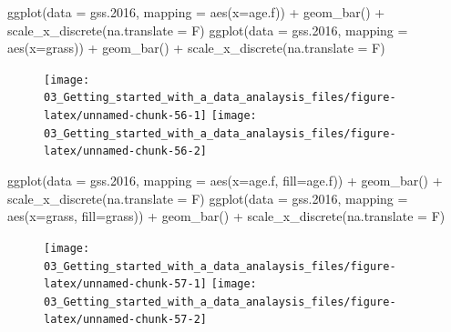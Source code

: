 \documentclass[
]{book}
\newenvironment{Shaded}{\begin{snugshade}}{\end{snugshade}}
\newcommand{\AttributeTok}[1]{\textcolor[rgb]{0.77,0.63,0.00}{#1}}
\newcommand{\FloatTok}[1]{\textcolor[rgb]{0.00,0.00,0.81}{#1}}
\newcommand{\FunctionTok}[1]{\textcolor[rgb]{0.00,0.00,0.00}{#1}}
\newcommand{\NormalTok}[1]{#1}
\newcommand{\SpecialCharTok}[1]{\textcolor[rgb]{0.00,0.00,0.00}{#1}}
\begin{document}
\begin{Shaded}
\begin{Highlighting}[]
\FunctionTok{ggplot}\NormalTok{(}\AttributeTok{data =}\NormalTok{ gss}\FloatTok{.2016}\NormalTok{, }\AttributeTok{mapping =} \FunctionTok{aes}\NormalTok{(}\AttributeTok{x=}\NormalTok{age.f)) }\SpecialCharTok{+} \FunctionTok{geom\_bar}\NormalTok{() }\SpecialCharTok{+} 
  \FunctionTok{scale\_x\_discrete}\NormalTok{(}\AttributeTok{na.translate =}\NormalTok{ F)}
\FunctionTok{ggplot}\NormalTok{(}\AttributeTok{data =}\NormalTok{ gss}\FloatTok{.2016}\NormalTok{, }\AttributeTok{mapping =} \FunctionTok{aes}\NormalTok{(}\AttributeTok{x=}\NormalTok{grass)) }\SpecialCharTok{+} \FunctionTok{geom\_bar}\NormalTok{() }\SpecialCharTok{+} 
  \FunctionTok{scale\_x\_discrete}\NormalTok{(}\AttributeTok{na.translate =}\NormalTok{ F)}
\end{Highlighting}
\end{Shaded}

\begin{figure}
\texttt{[image: 03\_Getting\_started\_with\_a\_data\_analaysis\_files/figure-latex/unnamed-chunk-56-1]} \texttt{[image: 03\_Getting\_started\_with\_a\_data\_analaysis\_files/figure-latex/unnamed-chunk-56-2]} \end{figure}

\begin{Shaded}
\begin{Highlighting}[]
\FunctionTok{ggplot}\NormalTok{(}\AttributeTok{data =}\NormalTok{ gss}\FloatTok{.2016}\NormalTok{, }\AttributeTok{mapping =} \FunctionTok{aes}\NormalTok{(}\AttributeTok{x=}\NormalTok{age.f, }\AttributeTok{fill=}\NormalTok{age.f)) }\SpecialCharTok{+} \FunctionTok{geom\_bar}\NormalTok{() }\SpecialCharTok{+} 
  \FunctionTok{scale\_x\_discrete}\NormalTok{(}\AttributeTok{na.translate =}\NormalTok{ F)}
\FunctionTok{ggplot}\NormalTok{(}\AttributeTok{data =}\NormalTok{ gss}\FloatTok{.2016}\NormalTok{, }\AttributeTok{mapping =} \FunctionTok{aes}\NormalTok{(}\AttributeTok{x=}\NormalTok{grass, }\AttributeTok{fill=}\NormalTok{grass)) }\SpecialCharTok{+} \FunctionTok{geom\_bar}\NormalTok{() }\SpecialCharTok{+} 
  \FunctionTok{scale\_x\_discrete}\NormalTok{(}\AttributeTok{na.translate =}\NormalTok{ F)}
\end{Highlighting}
\end{Shaded}

\begin{figure}
\texttt{[image: 03\_Getting\_started\_with\_a\_data\_analaysis\_files/figure-latex/unnamed-chunk-57-1]} \texttt{[image: 03\_Getting\_started\_with\_a\_data\_analaysis\_files/figure-latex/unnamed-chunk-57-2]} \end{figure}
\end{document}
